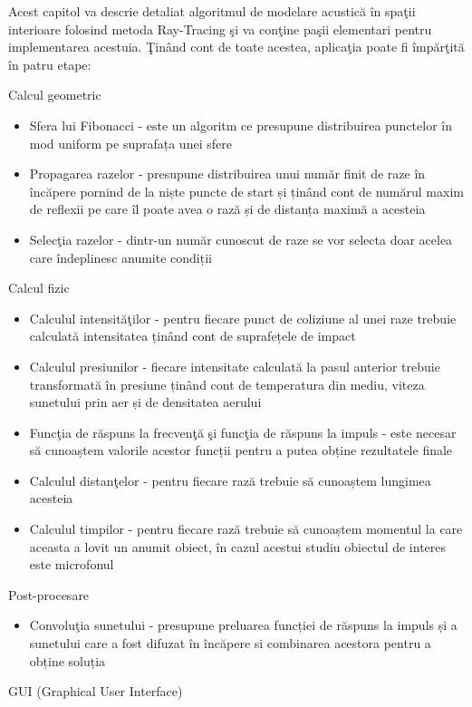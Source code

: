 Acest capitol va descrie detaliat algoritmul de modelare acustic\u{a} \^{i}n spa\c{t}ii interioare folosind metoda Ray-Tracing \c{s}i va con\c{t}ine pa\c{s}ii elementari pentru implementarea acestuia. \c{T}in\^{a}nd cont de toate acestea, aplica\c{t}ia poate fi \^{i}mp\u{a}r\c{t}it\u{a} \^{i}n patru etape:
\begin{enumerate}
	\utb Calcul geometric
	\begin{itemize}
		\item Sfera lui Fibonacci - este un algoritm ce presupune distribuirea punctelor în mod uniform pe suprafața unei sfere
		\item Propagarea razelor - presupune distribuirea unui număr finit de raze în încăpere pornind de la niște puncte de start și ținând cont de numărul maxim de reflexii pe care îl poate avea o rază și de distanța maximă a acesteia
		\item Selec\c{t}ia razelor - dintr-un număr cunoscut de raze se vor selecta doar acelea care îndeplinesc anumite condiții
	\end{itemize}
	\utb Calcul fizic
	\begin{itemize}
		\item Calculul intensit\u{a}\c{t}ilor - pentru fiecare punct de coliziune al unei raze trebuie calculată intensitatea ținând cont de suprafețele de impact
		\item Calculul presiunilor - fiecare intensitate calculată la pasul anterior trebuie transformată în presiune ținând cont de temperatura din mediu, viteza sunetului prin aer și de densitatea aerului
		\item Func\c{t}ia de r\u{a}spuns la frecven\c{t}\u{a} \c{s}i func\c{t}ia de r\u{a}spuns la impuls - este necesar să cunoaștem valorile acestor funcții pentru a putea obține rezultatele finale
		\item Calculul distan\c{t}elor - pentru fiecare rază trebuie să cunoaștem lungimea acesteia
		\item Calculul timpilor - pentru fiecare rază trebuie să cunoaștem momentul la care aceasta a lovit un anumit obiect, în cazul acestui studiu obiectul de interes este microfonul
	\end{itemize}
	\utb Post-procesare 
	\begin{itemize}
		\item Convolu\c{t}ia sunetului - presupune preluarea funcției de răspuns la impuls și a sunetului care a fost difuzat în încăpere si combinarea acestora pentru a obține soluția
	\end{itemize}
	\utb GUI (Graphical User Interface)
\end{enumerate}
 

